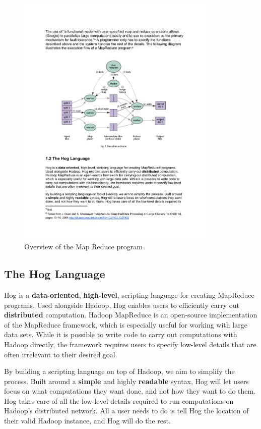 \documentclass{article}
\begin{document}
\begin{center}
\begin{figure}
  \label{fig:map_reduce_overview}
  \includegraphics[width=0.85\textwidth]{img/map_reduce_overview.pdf}
  \caption{Overview of the Map Reduce program}
\end{figure}
\end{center}

\subsection{The Hog Language}
\label{sub:hog_language}

Hog is a \textbf{data-oriented}, \textbf{high-level}, scripting language for
creating MapReduce programs. Used alongside Hadoop, Hog enables users to
efficiently carry out \textbf{distributed} computation. Hadoop MapReduce is an
open-source implementation of the MapReduce framework, which is especially useful
for working with large data sets. While it is possible to write code to carry out
computations with Hadoop directly, the framework requires users to specify
low-level details that are often irrelevant to their desired goal.

By building a scripting language on top of Hadoop, we aim to simplify the process.
Built around a \textbf{simple} and highly \textbf{readable} syntax, Hog will let
users focus on what computations they want done, and not how they want to do them.
Hog takes care of all the low-level details required to run computations on
Hadoop’s distributed network. All a user needs to do is tell Hog the location of
their valid Hadoop instance, and Hog will do the rest.
\end{document}

